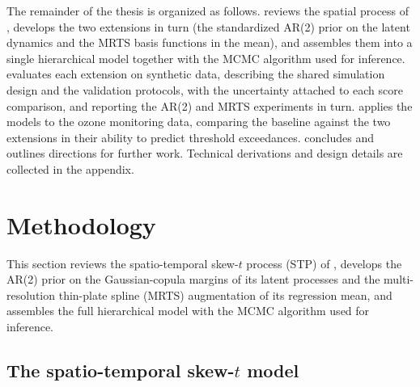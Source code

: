 \documentclass[12pt]{article}
\begin{document}
The remainder of the thesis is organized as follows. 
reviews the spatial \skewt process of \textcite{morris_space-time_2017}, develops
the two extensions in turn (the standardized AR(2) prior on the latent dynamics
and the MRTS basis functions in the mean), and assembles them into a single
hierarchical model together with the MCMC algorithm used for inference.
 evaluates each extension on synthetic data, describing the
shared simulation design and the validation protocols, with the uncertainty
attached to each score comparison, and reporting the AR(2) and MRTS experiments
in turn.
 applies the models to the ozone monitoring data, comparing the
baseline against the two extensions in their ability to predict threshold
exceedances.  concludes and outlines directions for further
work. Technical derivations and design details are collected in the appendix.

\section{Methodology}\label{sec:methodology}

This section reviews the spatio-temporal skew-$t$ process (STP) of \textcite{morris_space-time_2017}, develops the AR(2) prior on the Gaussian-copula margins of its latent processes and the multi-resolution thin-plate spline (MRTS) augmentation of its regression mean, and assembles the full hierarchical model with the MCMC algorithm used for inference.

\subsection{The spatio-temporal skew-$t$ model}\label{sec:sttskewt}
\end{document}
